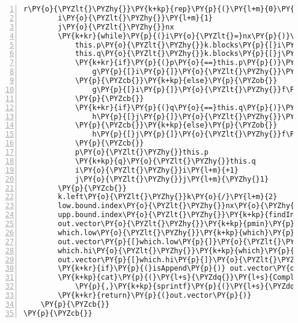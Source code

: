 \begin{Verbatim}[commandchars=\\\{\},codes={\catcode`\$=3\catcode`\^=7\catcode`\_=8},gobble=0,numbers=left,fontfamily=fvm,fontshape=n,fontsize=\footnotesize,tabsize=2]
		r\PY{o}{\PYZlt{}\PYZhy{}}\PY{k+kp}{rep}\PY{p}{(}\PY{l+m}{0}\PY{p}{,}nx\PY{p}{)}
		i\PY{o}{\PYZlt{}\PYZhy{}}\PY{l+m}{1}
		j\PY{o}{\PYZlt{}\PYZhy{}}nx
		\PY{k+kr}{while}\PY{p}{(}i\PY{o}{\PYZlt{}=}nx\PY{p}{)}\PY{p}{\PYZob{}}
			this.p\PY{o}{\PYZlt{}\PYZhy{}}k.blocks\PY{p}{[}i\PY{l+m}{+1}\PY{p}{]}
			this.q\PY{o}{\PYZlt{}\PYZhy{}}k.blocks\PY{p}{[}j\PY{l+m}{+1}\PY{p}{]}
			\PY{k+kr}{if}\PY{p}{(}p\PY{o}{==}this.p\PY{p}{)}\PY{p}{\PYZob{}}
				g\PY{p}{[}i\PY{p}{]}\PY{o}{\PYZlt{}\PYZhy{}}\PY{k+kp}{min}\PY{p}{(}g\PY{p}{[}i\PY{l+m}{\PYZhy{}1}\PY{p}{]}\PY{p}{,}f\PY{p}{[}i\PY{p}{]}\PY{p}{)}
			\PY{p}{\PYZcb{}}\PY{k+kp}{else}\PY{p}{\PYZob{}}
				g\PY{p}{[}i\PY{p}{]}\PY{o}{\PYZlt{}\PYZhy{}}f\PY{p}{[}i\PY{p}{]}
			\PY{p}{\PYZcb{}}
			\PY{k+kr}{if}\PY{p}{(}q\PY{o}{==}this.q\PY{p}{)}\PY{p}{\PYZob{}}
				h\PY{p}{[}j\PY{p}{]}\PY{o}{\PYZlt{}\PYZhy{}}\PY{k+kp}{min}\PY{p}{(}h\PY{p}{[}j\PY{l+m}{+1}\PY{p}{]}\PY{p}{,}f\PY{p}{[}j\PY{p}{]}\PY{p}{)}
			\PY{p}{\PYZcb{}}\PY{k+kp}{else}\PY{p}{\PYZob{}}
				h\PY{p}{[}j\PY{p}{]}\PY{o}{\PYZlt{}\PYZhy{}}f\PY{p}{[}j\PY{p}{]}
			\PY{p}{\PYZcb{}}
			p\PY{o}{\PYZlt{}\PYZhy{}}this.p
			\PY{k+kp}{q}\PY{o}{\PYZlt{}\PYZhy{}}this.q
			i\PY{o}{\PYZlt{}\PYZhy{}}i\PY{l+m}{+1}
			j\PY{o}{\PYZlt{}\PYZhy{}}j\PY{l+m}{\PYZhy{}1}
		\PY{p}{\PYZcb{}}
		k.left\PY{o}{\PYZlt{}\PYZhy{}}k\PY{o}{/}\PY{l+m}{2}
		low.bound.index\PY{o}{\PYZlt{}\PYZhy{}}nx\PY{o}{\PYZhy{}}\PY{k+kp}{rev}\PY{p}{(}\PY{k+kp}{findInterval}\PY{p}{(}\PY{k+kp}{rev}\PY{p}{(}\PY{o}{\PYZhy{}}x\PY{p}{)}\PY{p}{,}\PY{k+kp}{rev}\PY{p}{(}\PY{o}{\PYZhy{}}\PY{p}{(}x\PY{o}{+}k.left\PY{p}{)}\PY{p}{)}\PY{p}{)}\PY{p}{)}\PY{l+m}{+1}
		upp.bound.index\PY{o}{\PYZlt{}\PYZhy{}}\PY{k+kp}{findInterval}\PY{p}{(}x\PY{o}{+}k.left\PY{p}{,}x\PY{p}{)}
		out.vector\PY{o}{\PYZlt{}\PYZhy{}}\PY{k+kp}{pmin}\PY{p}{(}h\PY{p}{[}low.bound.index\PY{p}{]}\PY{p}{,}g\PY{p}{[}upp.bound.index\PY{p}{]}\PY{p}{)}
		which.low\PY{o}{\PYZlt{}\PYZhy{}}\PY{k+kp}{which}\PY{p}{(}k.blocks\PY{p}{[}low.bound.index\PY{p}{]}\PY{o}{==}k.blocks\PY{p}{[}upp.bound.index\PY{l+m}{+1}\PY{p}{]}\PY{p}{)}
		out.vector\PY{p}{[}which.low\PY{p}{]}\PY{o}{\PYZlt{}\PYZhy{}}h\PY{p}{[}low.bound.index\PY{p}{[}which.low\PY{p}{]]}
		which.hi\PY{o}{\PYZlt{}\PYZhy{}}\PY{k+kp}{which}\PY{p}{(}k.blocks\PY{p}{[}low.bound.index\PY{l+m}{+1}\PY{p}{]}\PY{o}{==}k.blocks\PY{p}{[}upp.bound.index\PY{l+m}{+2}\PY{p}{]}\PY{p}{)}
		out.vector\PY{p}{[}which.hi\PY{p}{]}\PY{o}{\PYZlt{}\PYZhy{}}g\PY{p}{[}upp.bound.index\PY{p}{[}which.hi\PY{p}{]]}
		\PY{k+kr}{if}\PY{p}{(}isAppend\PY{p}{)} out.vector\PY{o}{\PYZlt{}\PYZhy{}}out.vector\PY{p}{[}\PY{o}{\PYZhy{}}nx\PY{p}{]}
		\PY{k+kp}{cat}\PY{p}{(}\PY{l+s}{\PYZdq{}}\PY{l+s}{Completed morphological erosion (cts scale) in\PYZdq{}}
			\PY{p}{,}\PY{k+kp}{sprintf}\PY{p}{(}\PY{l+s}{\PYZdq{}}\PY{l+s}{\PYZpc{}.2f\PYZdq{}}\PY{p}{,}\PY{k+kp}{proc.time}\PY{p}{(}\PY{p}{)}\PY{p}{[}\PY{l+m}{3}\PY{p}{]}\PY{o}{\PYZhy{}}t1\PY{p}{)}\PY{p}{,}\PY{l+s}{\PYZdq{}}\PY{l+s}{seconds \PYZbs{}n\PYZdq{}}\PY{p}{)}
		\PY{k+kr}{return}\PY{p}{(}out.vector\PY{p}{)}
	\PY{p}{\PYZcb{}}		
\PY{p}{\PYZcb{}}
\end{Verbatim}
